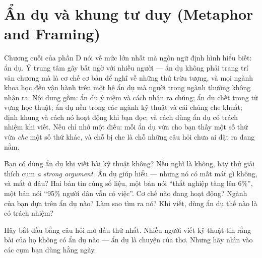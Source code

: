 \documentclass[../../english.tex]{subfiles}
\begin{document}
\chapter{Ẩn dụ và khung tư duy (Metaphor and Framing)}

\begin{tomtat}
Chương cuối của phần D nói về mức lớn nhất mà ngôn ngữ định hình hiểu biết: ẩn dụ. Ý trung tâm gây bất ngờ với nhiều người --- ẩn dụ không phải trang trí văn chương mà là cơ chế cơ bản để nghĩ về những thứ trừu tượng, và mọi ngành khoa học đều vận hành trên một hệ ẩn dụ mà người trong ngành thường không nhận ra. Nội dung gồm: ẩn dụ ý niệm và cách nhận ra chúng; ẩn dụ chết trong từ vựng học thuật; ẩn dụ nền trong các ngành kỹ thuật và cái chúng che khuất; định khung và cách nó hoạt động khi bạn đọc; và cách dùng ẩn dụ có trách nhiệm khi viết. Nếu chỉ nhớ một điều: mỗi ẩn dụ vừa cho bạn thấy một số thứ vừa \emph{che} một số thứ khác, và chỗ bị che là chỗ những câu hỏi chưa ai đặt ra đang nằm.
\end{tomtat}

\begin{nentang}
\end{nentang}

\begin{khoigoi}
\h{Bạn có dùng ẩn dụ khi viết bài kỹ thuật không? Nếu nghĩ là không, hãy thử giải thích cụm \emph{a strong argument}.}
\h{Ẩn dụ giúp hiểu --- nhưng nó có mất mát gì không, và mất ở đâu?}
\h{Hai bản tin cùng số liệu, một bản nói ``thất nghiệp tăng lên 6\%'', một bản nói ``95\% người dân vẫn có việc''. Cơ chế nào đang hoạt động?}
\h{Ngành của bạn dựa trên ẩn dụ nào? Làm sao tìm ra nó?}
\h{Khi viết, dùng ẩn dụ thế nào là có trách nhiệm?}
\end{khoigoi}

Hãy bắt đầu bằng câu hỏi mở đầu thứ nhất. Nhiều người viết kỹ thuật tin rằng bài của họ không có ẩn dụ nào --- ẩn dụ là chuyện của thơ. Nhưng hãy nhìn vào các cụm bạn dùng hằng ngày.
\end{document}
